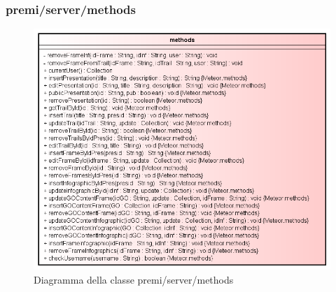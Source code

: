 \subsubsection{premi/server/methods}
\begin{figure}[H]
\begin{center}
\includegraphics[scale=0.65]{img/diacla/methods.png}
\caption{Diagramma della classe premi/server/methods}
\end{center}
\end{figure}




